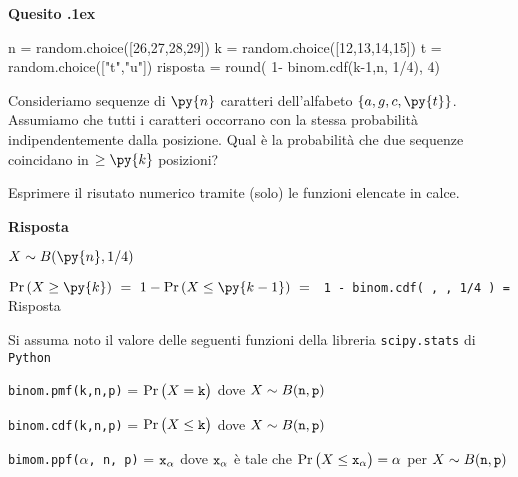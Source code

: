 \documentclass[11pt,twoside,a4paper]{article}
\newcounter{quesito}
\newenvironment{question}{\bigskip\addtocounter{quesito}{1}\bigskip\bigskip\par\textbf{Quesito \thequesito.\kern1ex}}{\vspace{\parskip}}
\newenvironment{answer}{\par\textbf{Risposta\quad}}{\vspace{\parskip}}
\begin{document}
\begin{question}
\begin{pycode}
n = random.choice([26,27,28,29])
k = random.choice([12,13,14,15])
t = random.choice(["t","u"])
risposta = round( 1- binom.cdf(k-1,n, 1/4), 4)
\end{pycode}
Consideriamo sequenze di $\py{n}$ caratteri dell'alfabeto $\{a,g,c,\py{t}\}$. Assumiamo che tutti i caratteri occorrano con la stessa probabilità indipendentemente dalla posizione. Qual è la probabilità che due sequenze coincidano in $\ge\py{k}$ posizioni?  

Esprimere il risutato numerico tramite (solo) le funzioni elencate in calce. 
\begin{answer}


$X\sim B(\py{n}, 1/4)$

$\Pr(X\ge \py{k})\ =\ 1-\Pr(X\le \py{k-1})\ =\ ${\tt{\color{blue}  1 -  binom.cdf( , , 1/4 )} = }{\color{blue}\hfill Risposta}
\end{answer}
\end{question}



\vfill
\hrulefill

Si assuma noto il valore delle seguenti funzioni della libreria {\tt scipy.stats\/} di  {\tt Python\/}

{\tt binom.pmf(k,n,p)} = $\Pr\big(X={\tt k}\big)$ dove $X\sim B({\tt n},{\tt p})$ 

{\tt binom.cdf(k,n,p)} = $\Pr\big(X\le{\tt k}\big)$ dove  $X\sim B({\tt n},{\tt p})$ 

{\tt bimom.ppf($\alpha$, n, p)} = ${\tt x_\alpha}$ dove ${\tt x_\alpha}$ è tale che $\Pr\big(X\le{\tt x_\alpha}\big)=\alpha$ per $X\sim B({\tt n},{\tt p})$ 
\end{document}

